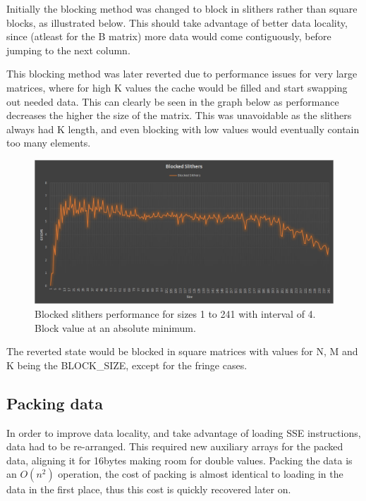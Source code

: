 \documentclass[a4paper,11pt,oneside]{book}
\begin{document}
Initially the blocking method was changed to block in slithers rather than square blocks, as illustrated below. This should take advantage of better data locality, since (atleast for the B matrix) more data would come contiguously, before jumping to the next column.


This blocking method was later reverted due to performance issues for very large matrices, where for high K values the cache would be filled and start swapping out needed data. This can clearly be seen in the graph below as performance decreases the higher the size of the matrix. This was unavoidable as the slithers always had K length, and even blocking with low values would eventually contain too many elements.

\begin{figure}
  \centering
  \includegraphics[width=0.9\linewidth]{graph-blocked-downcurve.png}
  \caption{Blocked slithers performance for sizes 1 to 241 with interval of 4. Block value at an absolute minimum.}
  \centering
  \label{fig:sub1}
\end{figure}

The reverted state would be blocked in square matrices with values for N, M and K being the BLOCK\_SIZE, except for the fringe cases.


\subsection{Packing data}
In order to improve data locality, and take advantage of loading SSE instructions, data had to be re-arranged. This required new auxiliary arrays for the packed data, aligning it for 16bytes making room for double values. Packing the data is an $O(n^2)$ operation, the cost of packing is almost identical to loading in the data in the first place, thus this cost is quickly recovered later on.
\end{document}
